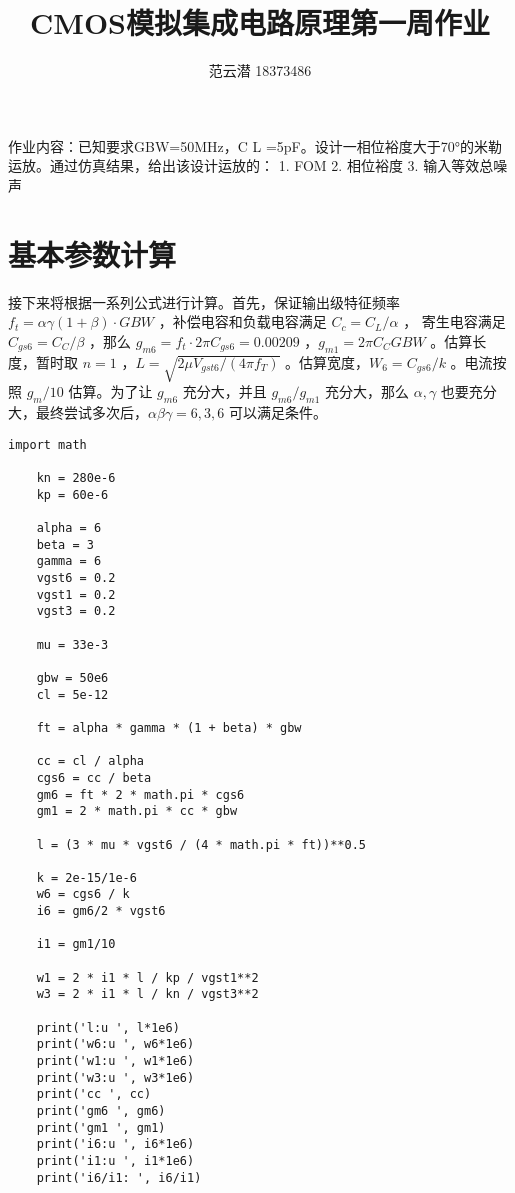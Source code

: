 \documentclass[lang=cn,11pt,a4paper,cite=authoryear]{elegantpaper}
\title{CMOS模拟集成电路原理\quad 第一周作业}
\author{范云潜 18373486}
\institute{微电子学院 184111 班}
\date{\zhtoday}
\begin{document}
\maketitle

作业内容：已知要求GBW=50MHz，C L =5pF。设计一相位裕度大于70°的米勒运放。通过仿真结果，给出该设计运放的：
1. FOM
2. 相位裕度
3. 输入等效总噪声

\tableofcontents

\listoffigures

\section{基本参数计算}

接下来将根据一系列公式进行计算。首先，保证输出级特征频率 \(f_t = \alpha \gamma (1 + \beta) \cdot GBW\) ，补偿电容和负载电容满足 \(C_c = C_L / \alpha\) ， 寄生电容满足 \(C_{gs6} = C_C / \beta\) ，那么 \(g_{m6} = f_t \cdot 2 \pi C_{gs6} = 0.00209\) ，\(g_{m1} = 2 \pi C_C GBW\) 。估算长度，暂时取 \(n=1\) ，\(L = \sqrt{2 \mu V_{gst6} / (4 \pi f_T)}\) 。估算宽度，\(W_6 = C_{gs6} / k\) 。电流按照 \(g_m / 10\) 估算。为了让 \(g_{m6}\) 充分大，并且 \(g_{m6} / g_{m1}\) 充分大，那么 \(\alpha, \gamma \) 也要充分大，最终尝试多次后，\(\alpha \beta \gamma = 6,3,6\) 可以满足条件。

\begin{lstlisting}[caption={估算程序}]
    import math 

    kn = 280e-6
    kp = 60e-6

    alpha = 6
    beta = 3
    gamma = 6
    vgst6 = 0.2
    vgst1 = 0.2
    vgst3 = 0.2

    mu = 33e-3

    gbw = 50e6
    cl = 5e-12

    ft = alpha * gamma * (1 + beta) * gbw 

    cc = cl / alpha 
    cgs6 = cc / beta 
    gm6 = ft * 2 * math.pi * cgs6
    gm1 = 2 * math.pi * cc * gbw 

    l = (3 * mu * vgst6 / (4 * math.pi * ft))**0.5

    k = 2e-15/1e-6
    w6 = cgs6 / k 
    i6 = gm6/2 * vgst6 

    i1 = gm1/10 

    w1 = 2 * i1 * l / kp / vgst1**2
    w3 = 2 * i1 * l / kn / vgst3**2

    print('l:u ', l*1e6)
    print('w6:u ', w6*1e6)
    print('w1:u ', w1*1e6)
    print('w3:u ', w3*1e6)
    print('cc ', cc)
    print('gm6 ', gm6)
    print('gm1 ', gm1)
    print('i6:u ', i6*1e6)
    print('i1:u ', i1*1e6)
    print('i6/i1: ', i6/i1)
    
\end{lstlisting}
\end{document}

